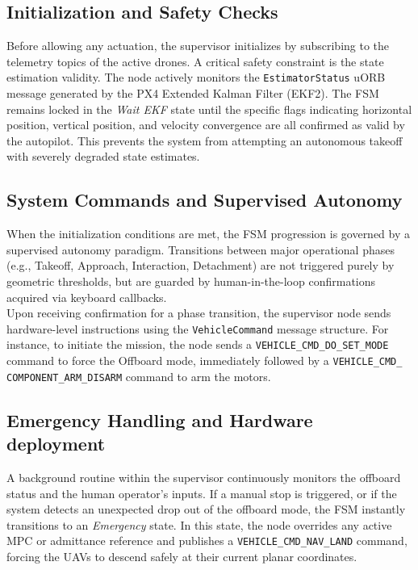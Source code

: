 \subsection{Initialization and Safety Checks}
Before allowing any actuation, the supervisor initializes by subscribing to the telemetry topics of the active drones. A critical safety constraint is the state estimation validity. The node actively monitors the \texttt{EstimatorStatus} uORB message generated by the PX4 Extended Kalman Filter (EKF2). The FSM remains locked in the \textit{Wait EKF} state until the specific flags indicating horizontal position, vertical position, and velocity convergence are all confirmed as valid by the autopilot. This prevents the system from attempting an autonomous takeoff with severely degraded state estimates.
\subsection{System Commands and Supervised Autonomy}
When the initialization conditions are met, the FSM progression is governed by a supervised autonomy paradigm. Transitions between major operational phases (e.g., Takeoff, Approach, Interaction, Detachment) are not triggered purely by geometric thresholds, but are guarded by human-in-the-loop confirmations acquired via keyboard callbacks.
\\Upon receiving confirmation for a phase transition, the supervisor node sends hardware-level instructions using the \texttt{VehicleCommand} message structure. For instance, to initiate the mission, the node sends a \texttt{VEHICLE\_CMD\_DO\_SET\_MODE} command to force the Offboard mode, immediately followed by a \texttt{VEHICLE\_CMD\_\\COMPONENT\_ARM\_DISARM} command to arm the motors. 
\subsection{Emergency Handling and Hardware deployment}
A background routine within the supervisor continuously monitors the offboard status and the human operator's inputs. If a manual stop is triggered, or if the system detects an unexpected drop out of the offboard mode, the FSM instantly transitions to an \textit{Emergency} state. In this state, the node overrides any active MPC or admittance reference and publishes a \texttt{VEHICLE\_CMD\_NAV\_LAND} command, forcing the UAVs to descend safely at their current planar coordinates.
